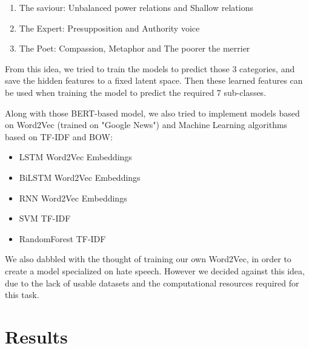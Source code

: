 \documentclass[11pt]{article}
\begin{document}
\begin{enumerate}
	      \begin{enumerate}
		      \item The saviour: Unbalanced power relations and Shallow relations

		      \item The Expert: Presupposition and Authority voice

		      \item The Poet: Compassion, Metaphor and The poorer the merrier

	      \end{enumerate}

	      From this idea, we tried to train the models to predict those 3
	      categories, and save the hidden features to a fixed latent space.
	      Then these learned features can be used when training the model to
	      predict the required 7 sub-classes.

	      Along with those BERT-based model, we also tried to implement models
	      based on Word2Vec \cite{mikolov2013word2vec} (trained on "Google News")
	      and Machine Learning algorithms based on TF-IDF and BOW:

	      \begin{itemize}
		      \item LSTM Word2Vec Embeddings \cite{staudemeyer2019understanding}
		      \item BiLSTM Word2Vec Embeddings \cite{huang2015bidirectional}
		      \item RNN Word2Vec Embeddings \cite{rnn}
		      \item SVM TF-IDF
		      \item RandomForest TF-IDF
	      \end{itemize}

	      We also dabbled with the thought of training our own Word2Vec, in
	      order to create a model specialized on hate speech. However we
	      decided against this idea, due to the lack of usable datasets and the
	      computational resources required for this task.


\end{enumerate}


\section{Results}
\end{document}
